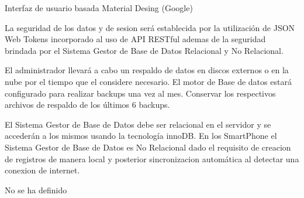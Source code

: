          Interfaz de usuario basada Material Desing (Google)
        
         La seguridad de los datos y de sesion será establecida por la utilización de JSON Web Tokens incorporado al uso de API RESTful ademas de la seguridad brindada por el Sistema Gestor de Base de Datos Relacional y No Relacional.

        
        El administrador llevará a cabo un respaldo de datos en discos externos o en la nube por el tiempo que el considere necesario. El motor de Base de datos estará configurado para realizar backups una vez al mes. Conservar los
        respectivos archivos de respaldo de los últimos 6 backups.
        
        
        El Sistema Gestor de Base de Datos debe ser relacional en el servidor y se accederán a los mismos usando la tecnología innoDB.
        En los SmartPhone el Sistema Gestor de Base de Datos es No Relacional dado el requisito de creacion de registros de manera local y posterior sincronizacion automática al detectar una conexion de internet. 
        
        
        No se ha definido
        

\setcounter{secnumdepth}{-1}



